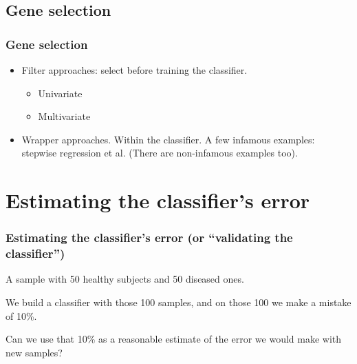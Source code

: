 \subsection{Gene selection}
\begin{frame}
\frametitle{Gene selection}
\begin{itemize}
\item Filter approaches: select before training the classifier.
\begin{itemize}
\item Univariate
\item Multivariate
\end{itemize}
\item Wrapper approaches. Within the classifier. A few infamous examples:
   stepwise regression et al. (There are non-infamous examples too).
\end{itemize}
\end{frame}


\section[Error estimation]{Estimating the classifier's error}
\begin{frame}
\frametitle{Estimating the classifier's error (or ``validating the classifier'')} 

A sample with 50 healthy subjects and 50 diseased ones.

We build a classifier with those 100 samples, and on those 100 we make a
mistake of 10\%.
\pause
\vspace*{30pt}

Can we use that 10\% as a reasonable estimate of the error we would make
with new samples?
\end{frame}






